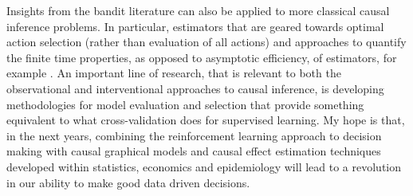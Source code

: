 \documentclass[11pt,a4paper,twoside]{report}
\theoremstyle{plain}
\theoremstyle{definition}
\begin{document}
Insights from the bandit literature can also be applied to more classical causal inference problems. In particular, estimators that are geared towards optimal action selection (rather than evaluation of all actions) and approaches to quantify the finite time properties, as opposed to asymptotic efficiency, of estimators, for example \citep{li2014minimax}. An important line of research, that is relevant to both the observational and interventional approaches to causal inference, is developing methodologies for model evaluation and selection that provide something equivalent to what cross-validation does for supervised learning. My hope is that, in the next years, combining the reinforcement learning approach to decision making with causal graphical models and causal effect estimation techniques developed within statistics, economics and epidemiology will lead to a revolution in our ability to make good data driven decisions. 

\end{document}
